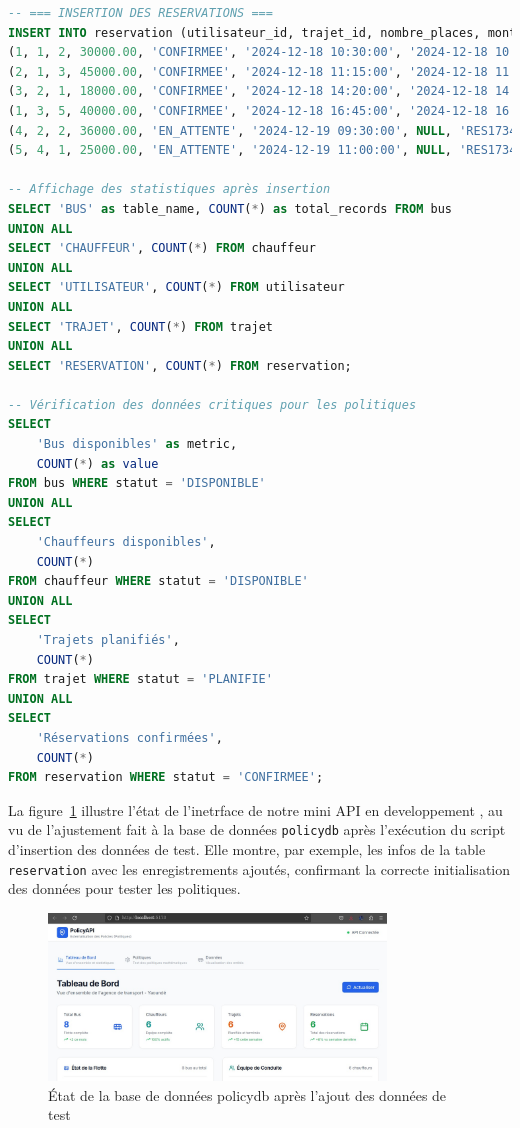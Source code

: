 \documentclass[12pt,a4paper]{article}
\begin{document}
\begin{tcolorbox}[codebox]
\begin{lstlisting}[language=SQL]
-- === INSERTION DES RESERVATIONS ===
INSERT INTO reservation (utilisateur_id, trajet_id, nombre_places, montant_total, statut, date_reservation, date_paiement, numero_reservation) VALUES
(1, 1, 2, 30000.00, 'CONFIRMEE', '2024-12-18 10:30:00', '2024-12-18 10:35:00', 'RES1734518400001'),
(2, 1, 3, 45000.00, 'CONFIRMEE', '2024-12-18 11:15:00', '2024-12-18 11:20:00', 'RES1734521700002'),
(3, 2, 1, 18000.00, 'CONFIRMEE', '2024-12-18 14:20:00', '2024-12-18 14:25:00', 'RES1734532800003'),
(1, 3, 5, 40000.00, 'CONFIRMEE', '2024-12-18 16:45:00', '2024-12-18 16:50:00', 'RES1734541500004'),
(4, 2, 2, 36000.00, 'EN_ATTENTE', '2024-12-19 09:30:00', NULL, 'RES1734602200005'),
(5, 4, 1, 25000.00, 'EN_ATTENTE', '2024-12-19 11:00:00', NULL, 'RES1734607200006');

-- Affichage des statistiques après insertion
SELECT 'BUS' as table_name, COUNT(*) as total_records FROM bus
UNION ALL
SELECT 'CHAUFFEUR', COUNT(*) FROM chauffeur
UNION ALL
SELECT 'UTILISATEUR', COUNT(*) FROM utilisateur
UNION ALL
SELECT 'TRAJET', COUNT(*) FROM trajet
UNION ALL
SELECT 'RESERVATION', COUNT(*) FROM reservation;

-- Vérification des données critiques pour les politiques
SELECT
    'Bus disponibles' as metric,
    COUNT(*) as value
FROM bus WHERE statut = 'DISPONIBLE'
UNION ALL
SELECT
    'Chauffeurs disponibles',
    COUNT(*)
FROM chauffeur WHERE statut = 'DISPONIBLE'
UNION ALL
SELECT
    'Trajets planifiés',
    COUNT(*)
FROM trajet WHERE statut = 'PLANIFIE'
UNION ALL
SELECT
    'Réservations confirmées',
    COUNT(*)
FROM reservation WHERE statut = 'CONFIRMEE';
        \end{lstlisting}
    \end{tcolorbox}

    La figure~\ref{fig:apres_policybd} illustre l'état de l'inetrface de notre mini API en developpement , au vu de l'ajustement fait à la base de données \texttt{policydb} après l'exécution du script d'insertion des données de test. Elle montre, par exemple, les infos de la table \texttt{reservation} avec les enregistrements ajoutés, confirmant la correcte initialisation des données pour tester les politiques.

    \begin{figure}[H]
        \centering
        \includegraphics[width=0.8\textwidth]{image-apres-bd.jpeg}
        \caption{État de la base de données policydb après l'ajout des données de test}
        \label{fig:apres_policybd}
    \end{figure}
\end{document}
